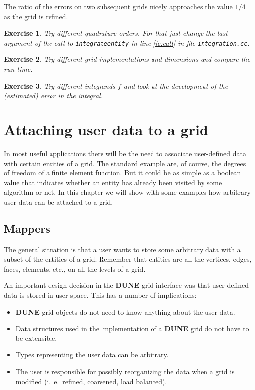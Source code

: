 \documentclass[11pt,a4paper,headinclude,footinclude,DIV16,normalheadings]{scrreprt}
\newcommand{\Dune}{{\sf\bfseries DUNE}\xspace}
\newtheorem{exc}{Exercise}[chapter]
\begin{document}
The ratio of the errors on two subsequent grids nicely approaches the
value $1/4$ as the grid is refined.


\begin{exc} Try different quadrature orders. For that just change the
  last argument of the call to \lstinline!integrateentity! in line
  \ref{ic:call} in file \lstinline!integration.cc!.
\end{exc}

\begin{exc} Try different grid implementations and dimensions and
  compare the run-time.
\end{exc}

\begin{exc} Try different integrands $f$ and look at the development
  of the (estimated) error in the integral. 
\end{exc}

\chapter{Attaching user data to a grid}

In most useful applications there will be the need to associate
user-defined data with certain entities of a grid. The standard
example are, of course, the degrees of freedom of a finite element
function. But it could be as simple as a boolean value that indicates
whether an entity has already been visited by some algorithm or
not. In this chapter we will show with some examples how arbitrary
user data can be attached to a grid.

\section{Mappers}\label{ch:mappers}

The general situation is that a user wants to store some arbitrary
data with a subset of the entities of a grid. Remember that entities
are all the vertices, edges, faces, elements, etc., on all the levels
of a grid.

An important design decision in the \Dune{} grid interface was that
user-defined data is stored in user space. This has a number of
implications:
\begin{itemize}
\item \Dune{} grid objects do not need to know anything about the user
  data.
\item Data structures used in the implementation of a \Dune{} grid do
  not have to be extensible.
\item Types representing the user data can be arbitrary.
\item The user is responsible for possibly reorganizing the data when
  a grid is modified (i.~e.~refined, coarsened, load balanced).
\end{itemize}
\end{document}
